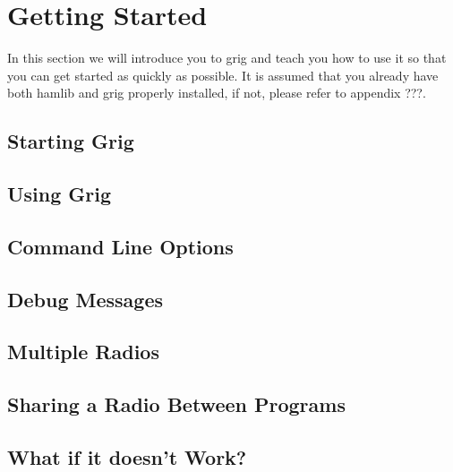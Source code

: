 \section{Getting Started}\label{sec:quickstart}

In this section we will introduce you to grig and teach you how to use it
so that you can get started as quickly as possible. It is assumed that
you  already have both hamlib and grig properly installed, if not,
please refer to appendix ???.

\subsection{Starting Grig}\label{subsec:start}


\subsection{Using Grig}\label{subsec:use}


\subsection{Command Line Options}\label{subsec:clo}


\subsection{Debug Messages}\label{subsec:debuse}


\subsection{Multiple Radios}\label{subsec:multirig}


\subsection{Sharing a Radio Between Programs}\label{subsec:rpc}


\subsection{What if it doesn't Work?}\label{subsec:help}
